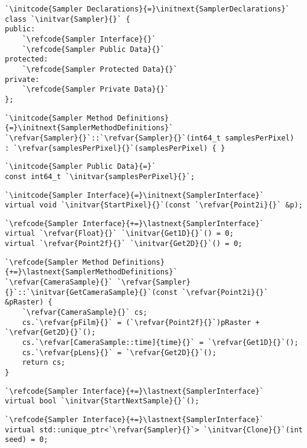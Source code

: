 \begin{lstlisting}
`\initcode{Sampler Declarations}{=}\initnext{SamplerDeclarations}`
class `\initvar{Sampler}{}` {
public:
    `\refcode{Sampler Interface}{}`
    `\refcode{Sampler Public Data}{}`
protected:
    `\refcode{Sampler Protected Data}{}`
private:
    `\refcode{Sampler Private Data}{}`
};
\end{lstlisting}
\begin{lstlisting}
`\initcode{Sampler Method Definitions}{=}\initnext{SamplerMethodDefinitions}`
`\refvar{Sampler}{}`::`\refvar{Sampler}{}`(int64_t samplesPerPixel)
: `\refvar{samplesPerPixel}{}`(samplesPerPixel) { }
\end{lstlisting}
\begin{lstlisting}
`\initcode{Sampler Public Data}{=}`
const int64_t `\initvar{samplesPerPixel}{}`;
\end{lstlisting}
\begin{lstlisting}
`\initcode{Sampler Interface}{=}\initnext{SamplerInterface}`
virtual void `\initvar{StartPixel}{}`(const `\refvar{Point2i}{}` &p);
\end{lstlisting}
\begin{lstlisting}
`\refcode{Sampler Interface}{+=}\lastnext{SamplerInterface}`
virtual `\refvar{Float}{}` `\initvar{Get1D}{}`() = 0;
virtual `\refvar{Point2f}{}` `\initvar{Get2D}{}`() = 0;
\end{lstlisting}
\begin{lstlisting}
`\refcode{Sampler Method Definitions}{+=}\lastnext{SamplerMethodDefinitions}`
`\refvar{CameraSample}{}` `\refvar{Sampler}{}`::`\initvar{GetCameraSample}{}`(const `\refvar{Point2i}{}` &pRaster) {
    `\refvar{CameraSample}{}` cs;
    cs.`\refvar{pFilm}{}` = (`\refvar{Point2f}{}`)pRaster + `\refvar{Get2D}{}`();
    cs.`\refvar[CameraSample::time]{time}{}` = `\refvar{Get1D}{}`();
    cs.`\refvar{pLens}{}` = `\refvar{Get2D}{}`();
    return cs;
}
\end{lstlisting}
\begin{lstlisting}
`\refcode{Sampler Interface}{+=}\lastnext{SamplerInterface}`
virtual bool `\initvar{StartNextSample}{}`();
\end{lstlisting}
\begin{lstlisting}
`\refcode{Sampler Interface}{+=}\lastnext{SamplerInterface}`
virtual std::unique_ptr<`\refvar{Sampler}{}`> `\initvar{Clone}{}`(int seed) = 0;
\end{lstlisting}